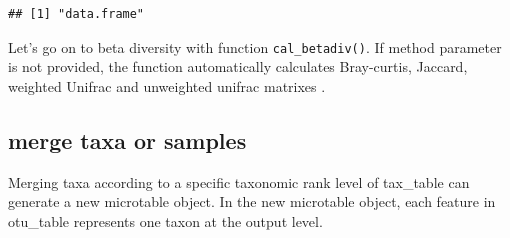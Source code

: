 \documentclass[
]{book}
\newenvironment{Shaded}{\begin{snugshade}}{\end{snugshade}}
\newcommand{\AttributeTok}[1]{\textcolor[rgb]{0.13,0.29,0.53}{#1}}
\newcommand{\CommentTok}[1]{\textcolor[rgb]{0.56,0.35,0.01}{\textit{#1}}}
\newcommand{\ConstantTok}[1]{\textcolor[rgb]{0.56,0.35,0.01}{#1}}
\newcommand{\FunctionTok}[1]{\textcolor[rgb]{0.13,0.29,0.53}{\textbf{#1}}}
\newcommand{\NormalTok}[1]{#1}
\newcommand{\OtherTok}[1]{\textcolor[rgb]{0.56,0.35,0.01}{#1}}
\newcommand{\SpecialCharTok}[1]{\textcolor[rgb]{0.81,0.36,0.00}{\textbf{#1}}}
\newcommand{\StringTok}[1]{\textcolor[rgb]{0.31,0.60,0.02}{#1}}
\begin{document}
\begin{verbatim}
## [1] "data.frame"
\end{verbatim}

\begin{Shaded}
\end{Shaded}

Let's go on to beta diversity with function \texttt{cal\_betadiv()}.
If method parameter is not provided, the function automatically calculates Bray-curtis, Jaccard, weighted Unifrac and unweighted unifrac matrixes \citep{Lozupone_UniFrac_2005}.

\begin{Shaded}
\end{Shaded}

\subsection{merge taxa or samples}\label{merge-taxa-or-samples}

Merging taxa according to a specific taxonomic rank level of tax\_table can generate a new microtable object.
In the new microtable object, each feature in otu\_table represents one taxon at the output level.

\begin{Shaded}
\end{Shaded}
\end{document}
